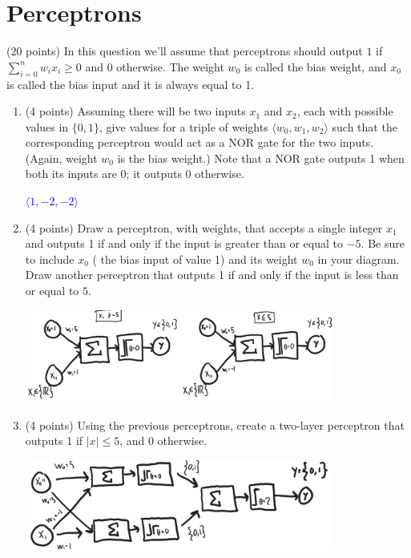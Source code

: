 \documentclass[12pt]{article}
\newenvironment{qparts}{\begin{enumerate}[{(}a{)}]}{\end{enumerate}}
\begin{document}
\section{Perceptrons}
 (20 points) In this question we'll assume that
perceptrons should output $1$ if  $ \sum_{i=0}^{n} w_i x_i \geq 0$ and 0 otherwise. The weight $w_0$ is called the bias weight, and $x_0$ is called the bias input and it is always equal to 1.
\begin{qparts}
  \item (4 points) Assuming there will be two inputs $x_1$ and $x_2$, each with possible values in $\{0,1\}$, give values for a triple of weights $\langle w_0,w_1,w_2 \rangle$  such that the corresponding perceptron would act as
  a NOR
  gate for the two inputs. (Again, weight $w_0$ is the bias weight.) Note that a
  NOR
  gate outputs 1 when both its inputs are 0;
  it outputs 0 otherwise.
  \vspace{0.5cm}

  \textcolor{blue}{$\langle 1,-2,-2 \rangle$}

  \item (4 points)  Draw a perceptron, with weights, that accepts a single integer $x_1$ and outputs 1 if and only if the input is greater than or equal to $-5$. Be sure to include $x_0$ ( the bias input of value 1) and its weight $w_0$ in your diagram.  Draw another perceptron that outputs 1 if and only if the input is less than or equal to $5$.
  \vspace{1cm}

  \includegraphics[width=0.8\textwidth]{Perceptrons.png}


  \item (4 points)  Using the previous perceptrons, create a two-layer perceptron that outputs 1
  if $|x| \le 5$, and 0 otherwise.
  \vspace{1.5cm}

  \includegraphics[width=0.8\textwidth]{2-layer.png}


\end{qparts}
\end{document}
